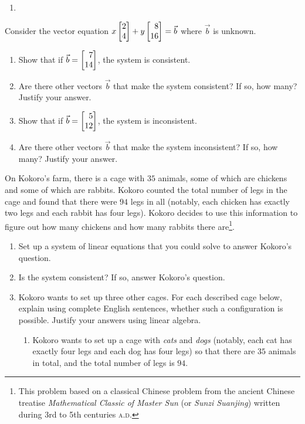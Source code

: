 \begin{exercises}
\begin{problist}
\begin{enumerate}
			\item {}
		\end{enumerate}

		\prob Consider the vector equation $x\mat{2 \\ 4}+y\mat{8 \\ 16}=\vec b$ where $\vec b$ is unknown.
		\begin{enumerate}
			\item Show that if $\vec b=\mat{7 \\ 14}$, the system is
				consistent.

			\item Are there other vectors $\vec b$ that make the system consistent?
				If so, how many? Justify your answer.

			\item Show that if $\vec b=\mat{5 \\ 12}$, the system is
				inconsistent.

			\item Are there other vectors $\vec b$ that make the system inconsistent?
				If so, how many? Justify your answer.
		\end{enumerate}

		\prob On Kokoro's farm, there is a cage with $35$ animals, some of which 
		are chickens
		and some of which are rabbits. Kokoro counted the total number of legs in the
		cage and found that there were $94$ legs in all (notably, each chicken
		has exactly two legs and each rabbit has four legs). Kokoro decides
		to use this information to figure out how many chickens and how many
		rabbits there are\footnote{ This problem based on a
		classical Chinese problem from the ancient Chinese treatise
		\emph{Mathematical Classic of Master Sun} (or \emph{Sunzi Suanjing}) written
		during 3rd to 5th centuries \textsc{a.d.}}.

		\begin{enumerate}
			\item Set up a system of linear equations that you could solve to answer
				Kokoro's question.

			\item Is the system consistent? If so, answer Kokoro's question.

			\item Kokoro wants to set up three other cages.
				For each described cage below, explain using complete English sentences,
				whether such a configuration is possible. Justify your answers using linear
				algebra.
				\begin{enumerate}
					\item Kokoro wants to set up a cage with \emph{cats}
						and \emph{dogs} (notably, each cat has exactly four legs
						and each dog has four legs) so that there are $35$
						animals in total, and the total number of legs is $94$.


\end{enumerate}
\end{enumerate}
\end{problist}
\end{exercises}
